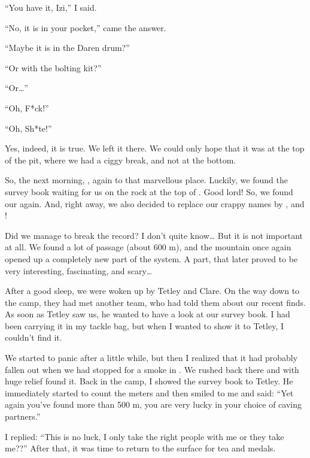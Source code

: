 ``You have it, Izi,'' I said.

``No, it is in your pocket,'' came the answer.

``Maybe it is in the Daren drum?''

``Or with the bolting kit?''

``Or\ldots{}''

``Oh, F*ck!''

``Oh, Sh*te!''

Yes, indeed, it is true. We left it there. We could only hope that it was at the top of the pit, where we had a ciggy break, and not at the bottom.

So, the next morning, , again to
that marvellous place. Luckily, we found the survey book waiting for us
on the rock at the top of . Good lord! So, we found our
 again. And, right away, we also decided to replace our
crappy names by , and !

Did we manage to break the record? I don't quite know\ldots{} But it is
not important at all. We found a lot of passage (about 600 m), and the
mountain once again opened up a completely new part of the system. A
part, that later proved to be very interesting, fascinating, and
scary\ldots{}



After a good sleep, we were woken up by Tetley and Clare. On the way down to the camp, they had met another team, who had told them about our recent finds. As soon as Tetley saw us, he wanted to have a look at our survey book. I had been carrying it in my tackle bag, but when I wanted to show it to Tetley, I couldn't find it.

We started to panic after a little while, but then I realized that it had probably fallen out when we had stopped for a smoke in . We rushed back there and with huge relief found it. Back in the camp, I showed the survey book to Tetley. He immediately started to count the meters and then smiled to me and said: ``Yet again you've found more than 500 m, you are very lucky in your choice of caving partners.''

I replied: ``This is no luck, I only take the right people with me or they take me??'' After that, it was time to return to the surface for tea and medals.



